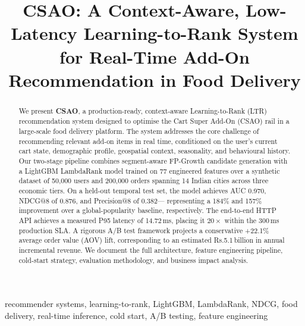 \documentclass[conference]{IEEEtran}
\newcommand{\rupee}{Rs.}
\begin{document}
\title{CSAO: A Context-Aware, Low-Latency Learning-to-Rank System\\
for Real-Time Add-On Recommendation in Food Delivery}

\author{
}

\maketitle

\begin{abstract}
We present \textbf{CSAO}, a production-ready, context-aware
Learning-to-Rank (LTR) recommendation system designed to optimise the
Cart Super Add-On (CSAO) rail in a large-scale food delivery platform.
The system addresses the core challenge of recommending relevant add-on
items in real time, conditioned on the user's current cart state, demographic
profile, geospatial context, seasonality, and behavioural history. Our
two-stage pipeline combines segment-aware FP-Growth candidate generation
with a LightGBM LambdaRank model trained on 77 engineered features over
a synthetic dataset of 50,000 users and 200,000 orders spanning 14 Indian
cities across three economic tiers. On a held-out temporal test set, the
model achieves AUC 0.970, NDCG@8 of 0.876, and Precision@8 of 0.382---
representing a 184\% and 157\% improvement over a global-popularity baseline,
respectively. The end-to-end HTTP API achieves a measured P95 latency of
14.72\,ms, placing it $20\times$ within the 300\,ms production SLA. A rigorous
A/B test framework projects a conservative +22.1\% average order value (AOV)
lift, corresponding to an estimated \rupee5.1\,billion in annual incremental
revenue. We document the full architecture, feature engineering pipeline,
cold-start strategy, evaluation methodology, and business impact analysis.
\end{abstract}

\begin{IEEEkeywords}
recommender systems, learning-to-rank, LightGBM, LambdaRank, NDCG,
food delivery, real-time inference, cold start, A/B testing, feature engineering
\end{IEEEkeywords}


\end{document}
